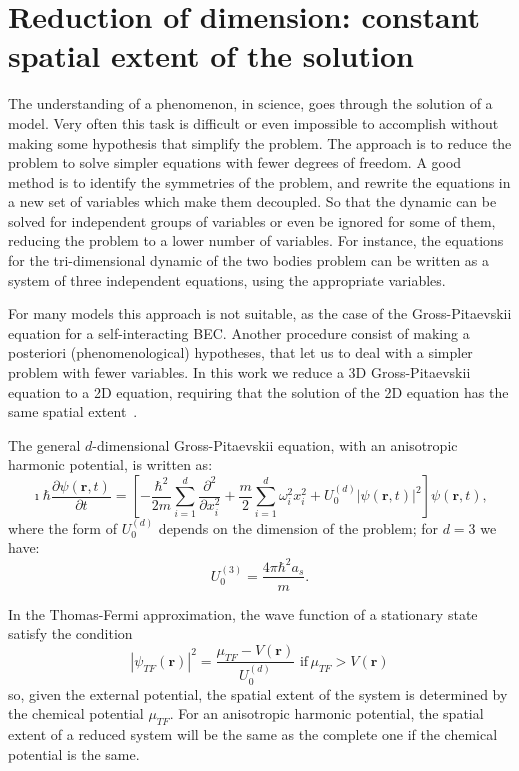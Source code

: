 \chapter{Reduction of dimension: constant spatial extent of the solution} \label{App:A}
The understanding of a phenomenon, in science, goes through the solution of a model. Very often this task is difficult or even impossible to accomplish without making some hypothesis that simplify the problem. The approach is to reduce the problem to solve simpler equations with fewer degrees of freedom. A good method is to identify the symmetries of the problem, and rewrite the equations in a new set of variables which make them decoupled. So that the dynamic can be solved for independent groups of variables or even be ignored for some of them, reducing the problem to a lower number of variables. For instance, the equations for the tri-dimensional dynamic of the two bodies problem can be written as a system of three independent equations, using the appropriate variables.

For many models this approach is not suitable, as the case of the Gross-Pitaevskii equation for a self-interacting BEC. Another procedure consist of making a posteriori (phenomenological) hypotheses, that let us to deal with a simpler problem with fewer variables. In this work we reduce a 3D Gross-Pitaevskii equation to a 2D equation, requiring that the solution of the 2D equation has the same spatial extent~\citep{PietroMassignan}.

The general $d$-dimensional Gross-Pitaevskii equation, with an anisotropic harmonic potential, is written as:
\begin{equation}
\imath \hbar \frac{\partial \psi(\textbf{r}, t)}{\partial t} = \left[ - \frac{\hbar^2}{2m} \sum_{i=1}^d \frac{\partial^2}{\partial x_i^2} + \frac{m}{2} \sum_{i=1}^d \omega_i^2 x_i^2 + U_0^{(d)} |\psi(\textbf{r}, t)|^2 \right] \psi(\textbf{r}, t),
\end{equation}
where the form of $U_0^{(d)}$ depends on the dimension of the problem; for $d=3$ we have:
\begin{equation}
U_0^{(3)} = \frac{4\pi \hbar^2 a_s}{m}.
\end{equation}

In the Thomas-Fermi approximation, the wave function of a stationary state satisfy the condition
\begin{equation}
|\psi_{TF}(\textbf{r})|^2 = \frac{\mu_{TF} - V(\textbf{r})}{U_0^{(d)}} \,\, \mathrm{if} \, \mu_{TF}  > V(\textbf{r})
\end{equation}
so, given the external potential, the spatial extent of the system is determined by the chemical potential $\mu_{TF}$. For an anisotropic harmonic potential, the spatial extent of a reduced system will be the same as the complete one if the chemical potential is the same.

